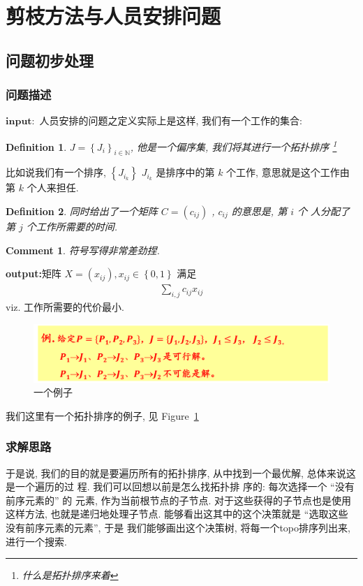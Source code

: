 \documentclass[a4paper, 10pt]{ctexart} %
\newtheorem{definition}{Definition}
\newtheorem{corollary}{Comment}
\begin{document}
\section{剪枝方法与人员安排问题}
\subsection{问题初步处理}
\subsubsection{问题描述}
\noindent $\mathbf{input}:$ 人员安排的问题之定义实际上是这样, 我们有一个工作的集合:
\begin{definition}
$J = \left\{J_{i}\right\}_{i \in \mathbb{N}}$, 
他是一个偏序集, 我们将其进行一个拓扑排序
\footnote{什么是拓扑排序来着}
\end{definition}
比如说我们有一个排序, $\left\{J_{i_{k}}\right\}$ $J_{i_{k}}$ 是排序中的第 $k$ 个工作,
意思就是这个工作由第 $k$ 个人来担任.
\begin{definition}
同时给出了一个矩阵 $C = \left(c_{ij}\right)$ , 
$c_{ij}$ 的意思是, 第 $i$ 个
人分配了第 $j$ 个工作所需要的时间. 
\end{definition}
\begin{corollary}
    符号写得非常差劲捏.
\end{corollary}

\noindent \textbf{output:}矩阵 $X = \left(x_{ij}\right) , x_{ij} \in \left\{ 0 , 1\right\}$ 
满足
\begin{align*}
    \sum_{i, j }  c_{ij} x_{ij} 
\end{align*}
viz. 工作所需要的代价最小.
\begin{figure}
\centering
\includegraphics[scale = 0.4]{ss2.png}
\caption{一个例子}
\label{fig:tu7}
\end{figure}
我们这里有一个拓扑排序的例子, 见 Figure~\ref{fig:tu7}
\subsubsection{求解思路}
于是说, 我们的目的就是要遍历所有的拓扑排序, 
从中找到一个最优解, 总体来说这是一个遍历的过
程. 我们可以回想以前是怎么找拓扑排
序的: 每次选择一个 ``没有前序元素的'' 的
元素, 作为当前根节点的子节点. 
对于这些获得的子节点也是使用这样方法, 也就是递归地处理子节点. 
能够看出这其中的这个决策就是 ``选取这些没有前序元素的元素'', 于是
我们能够画出这个决策树, 将每一个topo排序列出来, 
进行一个搜索.
\end{document}
